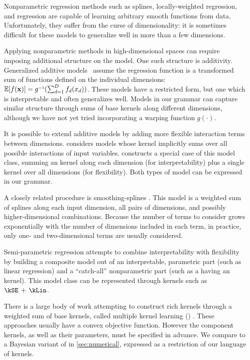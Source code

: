Nonparametric regression methods such as splines, locally-weighted regression, and \gp{} regression are capable of learning arbitrary smooth functions from data.
Unfortunately, they suffer from the curse of dimensionality: it is sometimes difficult for these models to generalize well in more than a few dimensions.

Applying nonparametric methods in high-dimensional spaces can require imposing additional structure on the model.
One such structure is additivity.
Generalized additive models~\citep{hastie1990generalized} assume the regression function is a transformed sum of functions defined on the individual dimensions: $\expect[f(\vx)] = g\inv(\sum_{d=1}^D f_d(x_d))$.
These models have a restricted form, but one which is interpretable and often generalizes well.
Models in our grammar can capture similar structure through sums of base kernels along different dimensions, although we have not yet tried incorporating a warping function $g(\cdot)$.

It is possible to extend additive models by adding more flexible interaction terms between dimensions. 
 considers \gp{} models whose kernel implicitly sums over all possible interactions of input variables.
\citet{plate1999accuracy} constructs a special case of this model class, summing an \kSE{} kernel along each dimension (for interpretability) plus a single \seard{} kernel over all dimensions (for flexibility).
Both types of model can be expressed in our grammar.

A closely related procedure is smoothing-splines \ANOVA{} \citep{wahba1990spline, gu2002smoothing}.
This model is a weighted sum of splines along each input dimension, all pairs of dimensions, and possibly higher-dimensional combinations.
Because the number of terms to consider grows exponentially with the number of dimensions included in each term, in practice, only one- and two-dimensional terms are usually considered.

Semi-parametric regression \citep[e.g.][]{ruppert2003semiparametric} attempts to combine interpretability with flexibility by building a composite model out of an interpretable, parametric part (such as linear regression) and a ``catch-all'' nonparametric part (such as a \gp{} having an \kSE{} kernel).
This model class can be represented through kernels such as ${\kSE \kernplus \kLin}$.


There is a large body of work attempting to construct rich kernels through a weighted sum of base kernels, called multiple kernel learning (\MKL{}) \citep[e.g.][]{gonen2011multiple, bach2004multiple}.
These approaches usually have a convex objective function.
However the component kernels, as well as their parameters, must be specified in advance.
We compare to a Bayesian variant of \MKL{} in \cref{sec:numerical}, expressed as a restriction of our language of kernels.


